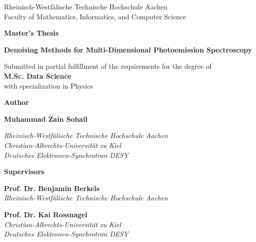 \begin{titlepage}
    \begin{center}
        \Large
        Rheinisch-Westfälische Technische Hochschule Aachen \\
        Faculty of Mathematics, Informatics, and Computer Science
        
        \vspace{1.2cm}
        
        \Huge
        \textbf{Master's Thesis}
            
        \vspace{0.8cm}
        
        \LARGE
        \textbf{Denoising Methods for Multi-Dimensional Photoemission Spectroscopy}
        
        \vspace{1cm}
        
        \normalsize
        Submitted in partial fulfillment of the requirements for the degree of \\
        \textbf{M.Sc. Data Science}\\
        with specialization in Physics
        
        \vspace{1cm}
        
        \large
        \textbf{Author} 

        \vspace{0.5cm}

        \textbf{Muhammad Zain Sohail}

        \normalsize
        \textit{Rheinisch-Westfälische Technische Hochschule Aachen} \\
        \textit{Christian-Albrechts-Universität zu Kiel} \\
        \textit{Deutsches Elektronen-Synchrotron DESY}
        
        \vspace{1.5cm}
        
        \large
        \textbf{Supervisors}
        
        \vspace{0.5cm}
        
        \textbf{Prof. Dr. Benjamin Berkels} \\
        \textit{Rheinisch-Westfälische Technische Hochschule Aachen}
        
        \vspace{0.3cm}
        
        \textbf{Prof. Dr. Kai Rossnagel} \\
        \textit{Christian-Albrechts-Universität zu Kiel} \\
        \textit{Deutsches Elektronen-Synchrotron DESY}
        

\end{center}
\end{titlepage}
